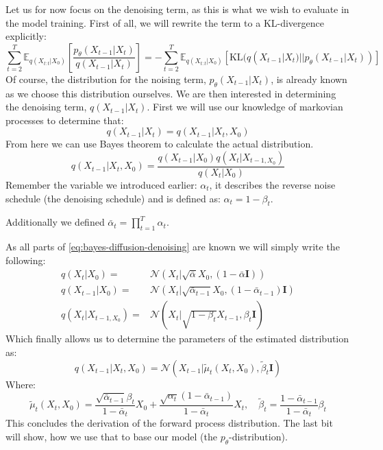 \documentclass[a4paper, 12pt]{olplainarticle}
\begin{document}
Let us for now focus on the denoising term, as this is what we wish to evaluate in the model training.
First of all, we will rewrite the term to a KL-divergence explicitly:
\begin{equation} \label{eq:kl-divergence}
    \sum_{t=2}^{T}\mathbb{E}_{q(X_{t:t}|X_0)}\left[\frac{p_{\theta}(X_{t-1}|X_{t})}{q(X_{t-1}|X_{t})} \right] = - \sum_{t=2}^{T}\mathbb{E}_{q(X_{t:t}|X_0)} \left[ \text{KL} (q(X_{t-1}|X_{t}) || p_{\theta}(X_{t-1}|X_{t})) \right]
\end{equation}
Of course, the distribution for the noising term, $p_{\theta}(X_{t-1}|X_{t})$, is already known as we choose this distribution ourselves. 
We are then interested in determining the denoising term, $q(X_{t-1}|X_{t})$.
First we will use our knowledge of markovian processes to determine that:
\begin{equation}
    q(X_{t-1}|X_{t}) = q(X_{t-1}|X_{t}, X_0)
\end{equation}
From here we can use Bayes theorem to calculate the actual distribution.
\begin{equation} \label{eq:bayes-diffusion-denoising}
    q(X_{t-1}|X_{t}, X_0) = \frac{q(X_{t-1}|X_0)q(X_t|X_{t-1,X_0})}{q(X_t|X_0)}
\end{equation}
Remember the variable we introduced earlier: $\alpha_t$, it describes the reverse noise schedule (the denoising schedule) and is defined as: $\alpha_t = 1- \beta_t$.

Additionally we defined $\bar{\alpha}_t = \prod_{t=1}^{T} \alpha_t$.

As all parts of \cref{eq:bayes-diffusion-denoising} are known we will simply write the following:
\begin{align}
    q(X_t|X_0) =& \mathcal{N}(X_t| \sqrt{\bar{\alpha}}X_0, (1-\bar{\alpha}\mathbf{I})) \\
    q(X_{t-1}|X_0) =& \mathcal{N}(X_t| \sqrt{\bar{\alpha}_{t-1}}X_0, (1-\bar{\alpha}_{t-1})\mathbf{I})\\
    q(X_t|X_{t-1,X_0}) =& \mathcal{N}(X_t| \sqrt{1-\beta_t}X_{t-1}, \beta_t \mathbf{I})
\end{align}
Which finally allows us to determine the parameters of the estimated distribution as:
\begin{equation} \label{eq:forward-process-distribution}
    q(X_{t-1}|X_{t}, X_0) = \mathcal{N}(X_{t-1}| \tilde{\mu}_t(X_t, X_0), \tilde{\beta}_t \mathbf{I})
\end{equation}
Where:
\begin{equation*}
    \tilde{\mu}_t(X_t, X_0) = \frac{\sqrt{\bar{\alpha}_{t-1}}\beta_t}{1-\bar{\alpha}_t}X_0 + \frac{\sqrt{\alpha_t}(1-\bar{\alpha}_{t-1})}{1-\bar{\alpha}_t}X_t, \quad \tilde{\beta}_t = \frac{1-\bar{\alpha}_{t-1}}{1-\bar{\alpha}_t}\beta_t
\end{equation*}
This concludes the derivation of the forward process distribution. 
The last bit will show, how we use that to base our model (the $p_{\theta}$-distribution).
\end{document}

